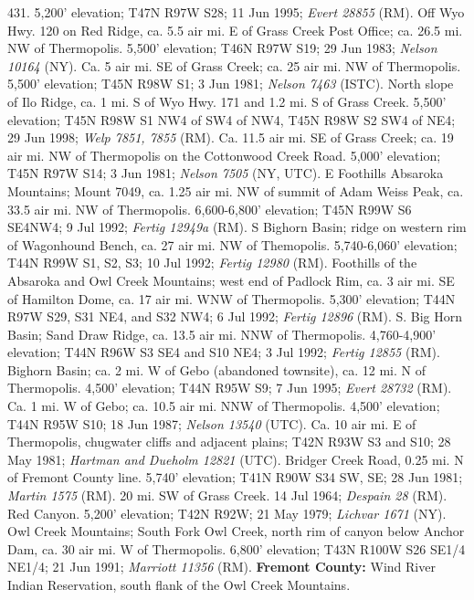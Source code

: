 431. 5,200' elevation; T47N R97W S28; 11 Jun 1995; \textit{Evert 28855} (RM).
Off Wyo Hwy. 120 on Red Ridge, ca. 5.5 air mi. E of Grass Creek Post Office;
ca. 26.5 mi. NW of Thermopolis. 5,500' elevation; T46N R97W S19; 29 Jun 1983;
\textit{Nelson 10164} (NY).
Ca. 5 air mi. SE of Grass Creek; ca. 25 air mi. NW of Thermopolis.
5,500' elevation; T45N R98W S1; 3 Jun 1981; \textit{Nelson 7463} (ISTC).
North slope of Ilo Ridge, ca. 1 mi. S of Wyo Hwy. 171 and 1.2 mi.
S of Grass Creek.	5,500' elevation; T45N R98W S1 NW4 of SW4 of NW4,
T45N R98W S2 SW4 of NE4; 29 Jun 1998;
\textit{Welp 7851, 7855} (RM).
Ca. 11.5 air mi. SE of Grass Creek; ca. 19 air mi. NW of
Thermopolis on the Cottonwood Creek Road. 5,000' elevation; T45N R97W S14;
3 Jun 1981; \textit{Nelson 7505} (NY, UTC).
E Foothills Absaroka Mountains; Mount 7049, ca. 1.25 air mi. NW of summit of
Adam Weiss Peak, ca. 33.5 air mi. NW of Thermopolis. 6,600-6,800' elevation;
T45N R99W S6	SE4NW4; 9 Jul 1992; \textit{Fertig 12949a} (RM).
S Bighorn Basin; ridge on western rim of Wagonhound Bench, ca. 27 air mi. NW of
Themopolis. 5,740-6,060' elevation; T44N R99W S1, S2, S3; 10 Jul 1992;
\textit{Fertig 12980} (RM).
Foothills of the Absaroka and Owl Creek Mountains; west end of Padlock Rim, ca.
3 air mi. SE of Hamilton Dome, ca. 17 air mi. WNW of Thermopolis.
5,300' elevation; T44N R97W S29, S31 NE4, and S32 NW4; 6 Jul 1992;
\textit{Fertig 12896} (RM).
S. Big Horn Basin; Sand Draw Ridge, ca. 13.5 air mi. NNW of Thermopolis.
4,760-4,900' elevation; T44N R96W S3 SE4 and S10 NE4; 3 Jul 1992;
\textit{Fertig 12855} (RM).
Bighorn Basin; ca. 2 mi. W of Gebo (abandoned townsite), ca. 12 mi. N of
Thermopolis. 4,500' elevation; T44N R95W S9; 7 Jun 1995;
\textit{Evert 28732} (RM).
Ca. 1 mi. W of Gebo; ca. 10.5 air mi. NNW of Thermopolis. 4,500' elevation;
T44N R95W S10; 18 Jun 1987; \textit{Nelson 13540} (UTC).
Ca. 10 air mi. E of Thermopolis, chugwater cliffs and adjacent plains;
T42N R93W S3 and S10; 28 May 1981; \textit{Hartman and Dueholm 12821} (UTC).
Bridger Creek Road, 0.25 mi. N of Fremont County line. 5,740' elevation;
T41N R90W S34 SW, SE; 	28 Jun 1981; \textit{Martin 1575} (RM).
20 mi. SW of Grass Creek. 14 Jul 1964; \textit{Despain 28} (RM).
Red Canyon. 5,200' elevation; T42N R92W; 21 May 1979; \textit{Lichvar 1671} (NY).
Owl Creek Mountains; South Fork Owl Creek, north rim of canyon below Anchor Dam,
ca. 30 air mi. W of Thermopolis. 6,800' elevation; T43N R100W S26	SE1/4 NE1/4;
21 Jun 1991; \textit{Marriott 11356} (RM).
  \textbf{Fremont County:}
Wind River Indian Reservation, south flank of the Owl Creek Mountains.
